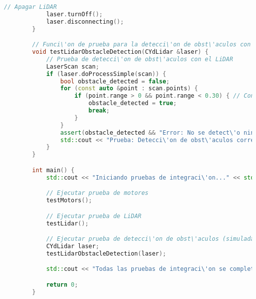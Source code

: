 \begin{lstlisting}[language={C++}, caption={C\'odigo de pruebas de integraci\'organismo}, label={Script}]
            // Apagar LiDAR
            laser.turnOff();
            laser.disconnecting();
        }

        // Funci\'on de prueba para la detecci\'on de obst\'aculos con LiDAR
        void testLidarObstacleDetection(CYdLidar &laser) {
            // Prueba de detecci\'on de obst\'aculos con el LiDAR
            LaserScan scan;
            if (laser.doProcessSimple(scan)) {
                bool obstacle_detected = false;
                for (const auto &point : scan.points) {
                    if (point.range > 0 && point.range < 0.30) { // Condici\'on de obst\'aculo
                        obstacle_detected = true;
                        break;
                    }
                }
                assert(obstacle_detected && "Error: No se detect\'o ning\'un obst\'aculo cuando se esperaba.");
                std::cout << "Prueba: Detecci\'on de obst\'aculos correcta." << std::endl;
            }
        }

        int main() {
            std::cout << "Iniciando pruebas de integraci\'on..." << std::endl;

            // Ejecutar prueba de motores
            testMotors();

            // Ejecutar prueba de LiDAR
            testLidar();

            // Ejecutar prueba de detecci\'on de obst\'aculos (simulada)
            CYdLidar laser;
            testLidarObstacleDetection(laser);

            std::cout << "Todas las pruebas de integraci\'on se completaron correctamente." << std::endl;

            return 0;
        }


    \end{lstlisting}
    \vskip 0.5cm
